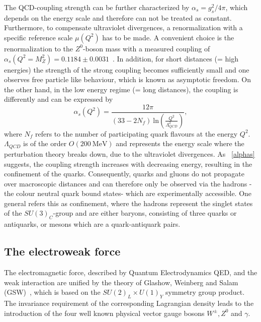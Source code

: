 \noindent The QCD-coupling strength can be further characterized by  $\alpha_s = g_s^2/4\pi$, which depends  on the energy scale and therefore can not be treated as constant. Furthermore, to compensate ultraviolet divergences, a renormalization with a specific reference scale $\mu(Q^2)$ has to be made. A convenient choice is the renormalization to the $Z^0$-boson mass with a measured coupling of $\alpha_s(Q^2=M_Z^2) = 0.1184 \pm 0.0031$~\cite{Bethke:2000ai}. In addition, for short distances (= high energies) the strength of the strong coupling becomes sufficiently small and one observes free particle like behaviour, which is known as asymptotic freedom. On the other hand, in the low energy regime (= long distances), the coupling is differently and can be expressed by 
\begin{equation}\label{alphas}
\alpha_s(Q^2)=\frac{12\pi}{(33-2N_f)~\text{ln}(\frac{Q^2}{\Lambda_{QCD}^2})},
\end{equation}
where $N_f$ refers to the number of participating quark flavours at the energy $Q^2$. $\Lambda_{QCD}$ is of the order $O(200~\text{MeV})$ and represents the energy scale where the perturbation theory  breaks down, due to the ultraviolet divergences. As ~\cref{alphas} suggests, the coupling strength increases with decreasing energy, resulting in the confinement of the quarks. Consequently, quarks and gluons do not propagate over macroscopic distances and can therefore only be observed via the hadrons -the colour neutral quark bound states- which are experimentally accessible. One general refers this as confinement, where the hadrons represent the singlet states of  the $SU(3)_C$-group and are either baryons, consisting of three quarks or antiquarks,  or mesons which are a quark-antiquark pairs. 
























\subsection{The electroweak force}\label{EW}
The electromagnetic force, described by Quantum Electrodynamics QED, and the weak interaction are unified by the theory of Glashow, Weinberg and Salam (GSW)~\cite{Glashow:1961tr,Weinberg:1967tq,Salam:1964ry}, which is based on the $SU(2)_L\times U(1)_Y$ symmetry group product. The invariance requirement of the corresponding Lagrangian density leads to the introduction of the four well known physical vector gauge bosons $W^{\pm}, Z^0$ and $\gamma$.

